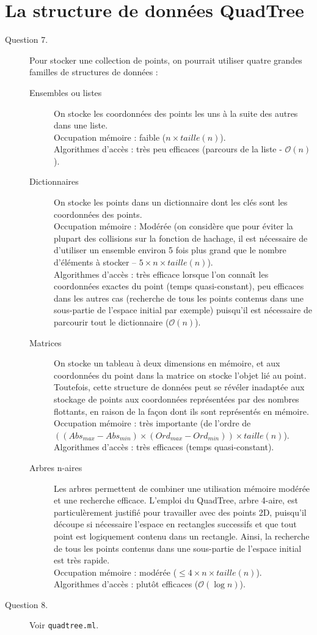 \documentclass[11pt]{scrartcl}
\newcommand{\filename}[1]{\texttt{\textcolor{RawSienna}{#1}}}
\begin{document}
\section{La structure de données QuadTree}

\begin{description}
\item[Question 7.] Pour stocker une collection de points, on pourrait utiliser quatre grandes familles de structures de données :
\begin{description}
\item[Ensembles ou listes] On stocke les coordonnées des points les uns à la suite des autres dans une liste.\\
Occupation mémoire : faible ($n \times taille(n)$).\\
Algorithmes d'accès : très peu efficaces (parcours de la liste - $\mathcal{O}(n)$).
\item[Dictionnaires] On stocke les points dans un dictionnaire dont les clés sont les coordonnées des points.\\
Occupation mémoire : Modérée (on considère que pour éviter la plupart des collisions sur la fonction de hachage, il est nécessaire de d'utiliser un ensemble environ 5 fois plus grand que le nombre d'éléments à stocker -- $5 \times n \times taille(n)$).\\
Algorithmes d'accès : très efficace lorsque l'on connaît les coordonnées exactes du point (temps quasi-constant), peu efficaces dans les autres cas (recherche de tous les points contenus dans une sous-partie de l'espace initial par exemple) puisqu'il est nécessaire de parcourir tout le dictionnaire ($\mathcal{O}(n)$).
\item[Matrices] On stocke un tableau à deux dimensions en mémoire, et aux coordonnées du point dans la matrice on stocke l'objet lié au point. Toutefois, cette structure de données peut se révéler inadaptée aux stockage de points aux coordonnées représentées par des nombres flottants, en raison de la façon dont ils sont représentés en mémoire.\\
Occupation mémoire : très importante (de l'ordre de $((Abs_{max} - Abs_{min}) \times (Ord_{max} - Ord_{min})) \times taille(n)$).\\
Algorithmes d'accès : très efficaces (temps quasi-constant).
\item[Arbres n-aires] Les arbres permettent de combiner une utilisation mémoire modérée et une recherche efficace. L'emploi du QuadTree, arbre 4-aire, est particulèrement justifié pour travailler avec des points 2D, puisqu'il découpe si nécessaire l'espace en rectangles successifs et que tout point est logiquement contenu dans un rectangle. Ainsi, la recherche de tous les points contenus dans une sous-partie de l'espace initial est très rapide.\\
Occupation mémoire : modérée ($\leq 4 \times n \times taille(n)$).\\
Algorithmes d'accès : plutôt efficaces ($\mathcal{O}(\log{}n)$).
\end{description}
\item[Question 8.] Voir \filename{quadtree.ml}.


\end{description}
\end{document}
